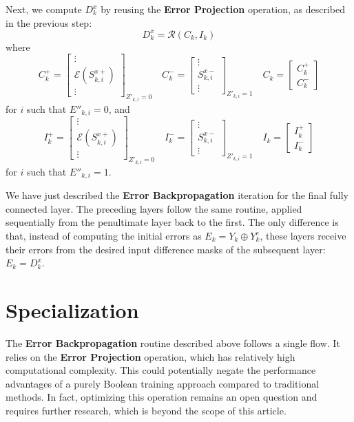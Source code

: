 \documentclass[pmlr]{jmlr}
\begin{document}
Next, we compute \( D^x_k \) by reusing the \textbf{Error Projection} operation, as described in the previous step:
\[ D^x_k = \mathcal{R}(C_k, I_k) \]
where
\[
    C^+_k = \begin{bmatrix} \vdots \\ \mathcal{E}(S^{x+}_{k,i}) \\ \vdots \end{bmatrix}_{Z'_{k,i} = 0} \quad
    C^-_k = \begin{bmatrix} \vdots \\ S^{x-}_{k,i} \\ \vdots \end{bmatrix}_{Z'_{k,i} = 1} \quad
    C_k = \begin{bmatrix} C^+_k \\ C^-_k \end{bmatrix}
\]
for \( i \) such that \( E''_{k,i} = 0 \), and
\[
    I^+_k = \begin{bmatrix} \vdots \\ \mathcal{E}(S^{x+}_{k,i}) \\ \vdots \end{bmatrix}_{Z'_{k,i} = 0} \quad
    I^-_k = \begin{bmatrix} \vdots \\ S^{x-}_{k,i} \\ \vdots \end{bmatrix}_{Z'_{k,i} = 1} \quad
    I_k = \begin{bmatrix} I^+_k \\ I^-_k \end{bmatrix}
\]
for \( i \) such that \( E''_{k,i} = 1 \).

We have just described the \textbf{Error Backpropagation} iteration for the final fully connected layer. The preceding layers follow the same routine, applied sequentially from the penultimate layer back to the first. The only difference is that, instead of computing the initial errors as \( E_k = Y_k \oplus Y^e_k \), these layers receive their errors from the desired input difference masks of the subsequent layer: \( E_k = D^x_k \).

\section{Specialization}
The \textbf{Error Backpropagation} routine described above follows a single flow. It relies on the \textbf{Error Projection} operation, which has relatively high computational complexity. This could potentially negate the performance advantages of a purely Boolean training approach compared to traditional methods. In fact, optimizing this operation remains an open question and requires further research, which is beyond the scope of this article.
\end{document}
